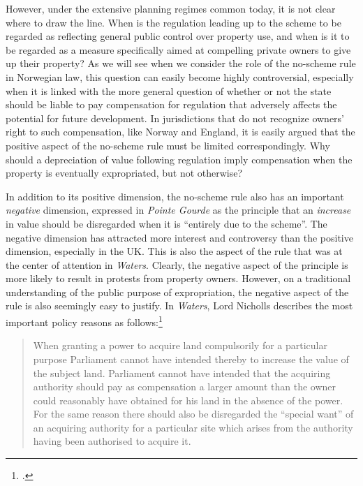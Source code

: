 However, under the extensive planning regimes common today, it is not clear where to draw the line. When is the regulation leading up to the scheme to be regarded as reflecting general public control over property use, and when is it to be regarded as a measure specifically aimed at compelling private owners to give up their property? As we will see when we consider the role of the no-scheme rule in Norwegian law, this question can easily become highly controversial, especially when it is linked with the more general question of whether or not the state should be liable to pay compensation for regulation that adversely affects the potential for future development. In jurisdictions that do not recognize owners' right to such compensation, like Norway and England, it is easily argued that the positive aspect of the no-scheme rule must be limited correspondingly. Why should a depreciation of value following regulation imply compensation when the property is eventually expropriated, but not otherwise?

In addition to its positive dimension, the no-scheme rule also has an important \emph{negative} dimension, expressed in {\it Pointe Gourde} as the principle that an {\it increase} in value should be disregarded when it is ``entirely due to the scheme''. The negative dimension has attracted more interest and controversy than the positive dimension, especially in the UK. This is also the aspect of the rule that was at the center of attention in {\it Waters}. Clearly, the negative aspect of the principle is more likely to result in protests from property owners. However, on a traditional understanding of the public purpose of expropriation, the negative aspect of the rule is also seemingly easy to justify. In \emph{Waters}, Lord Nicholls describes the most important policy reasons as follows:\footcite[18]{waters04}

\begin{quote}
When granting a power to acquire land compulsorily for a particular purpose Parliament cannot have intended thereby to increase the value of the subject land. Parliament cannot have intended that the acquiring authority should pay as compensation a larger amount than the owner could reasonably have obtained for his land in the absence of the power. For the same reason there should also be disregarded the ``special want'' of an acquiring authority for a particular site which arises from the authority having been authorised to acquire it.
\end{quote}


